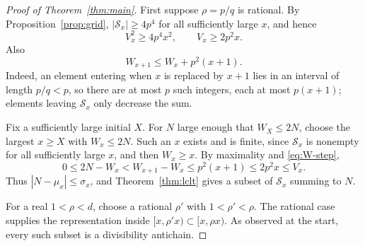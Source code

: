\documentclass[10pt,reqno]{amsart}
\newcommand{\Sx}{\mathcal S_x}
\begin{document}
\begin{proof}[Proof of Theorem~\ref{thm:main}]
First suppose $\rho=p/q$ is rational.  By Proposition~\ref{prop:grid},
$|\Sx|\ge4p^4$ for all sufficiently large $x$, and hence
\begin{equation}\label{eq:V-sweep}
 V_x^2\ge4p^4x^2,
 \qquad V_x\ge2p^2x.
\end{equation}
Also
\begin{equation}\label{eq:W-step}
 W_{x+1}\le W_x+p^2(x+1).
\end{equation}
Indeed, an element entering when $x$ is replaced by $x+1$ lies in an interval
of length $p/q<p$, so there are at most $p$ such integers, each at most
$p(x+1)$; elements leaving $\Sx$ only decrease the sum.

Fix a sufficiently large initial $X$.  For $N$ large enough that $W_X\le2N$,
choose the largest $x\ge X$ with $W_x\le2N$.  Such an $x$ exists and is finite,
since $\Sx$ is nonempty for all sufficiently large $x$, and then $W_x\ge x$.  By
maximality and \eqref{eq:W-step},
\[
 0\le2N-W_x<W_{x+1}-W_x\le p^2(x+1)\le2p^2x\le V_x.
\]
Thus $|N-\mu_x|\le\sigma_x$, and Theorem~\ref{thm:lclt} gives a subset of
$\Sx$ summing to $N$.

For a real $1<\rho<d$, choose a rational $\rho'$ with
$1<\rho'<\rho$.  The rational case supplies the representation inside
$[x,\rho'x)\subset[x,\rho x)$.  As observed at the start, every such subset is
a divisibility antichain.
\end{proof}
\end{document}
